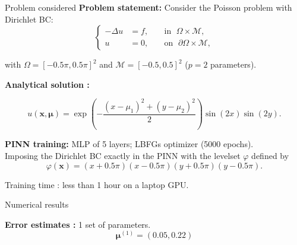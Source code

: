 

\begin{appendixframe}{Problem considered} 
	\textbf{Problem statement:} Consider the Poisson problem with Dirichlet BC:
	\vspace{-5pt}
	\begin{equation*}
		\left\{
		\begin{aligned}
			-\Delta u & = f, \; &  & \text{in } \; \Omega \times \mathcal{M}, \\
			u         & =0, \;  &  & \text{on } \; \partial\Omega \times \mathcal{M},
		\end{aligned}
		\right.
	\end{equation*}

	\vspace{-5pt}
	with $\Omega=[-0.5 \pi, 0.5 \pi]^2$ and $\mathcal{M}=[-0.5,0.5]^2$ ($p=2$ parameters).
		
	\vspace{8pt}
	\textbf{Analytical solution :}

	\vspace{-5pt}
	\begin{equation*}
		u(\bm{x},\bm{\mu})=\exp\left(-\frac{(x-\mu_1)^2+(y-\mu_2)^2}{2}\right)\sin(2 x)\sin(2 y).
	\end{equation*}

	\vspace{12pt}
	\textbf{PINN training:} MLP of 5 layers; LBFGs optimizer (5000 epochs). \\
	Imposing the Dirichlet BC exactly in the PINN with the levelset $\varphi$ defined by
	$$\varphi(\bm{x})=(x+0.5\pi)(x-0.5\pi)(y+0.5\pi)(y-0.5\pi).$$
	
	\small\vspace{4pt}
	Training time : less than 1 hour on a laptop GPU.
\end{appendixframe}

\begin{appendixframe}{Numerical results}
	\hspace{-5pt}\begin{minipage}[t]{0.46\linewidth}
		\textbf{Error estimates :} 1 set of parameters.
		$$\bm{\mu}^{(1)}=(0.05, 0.22) $$
		\vspace{-35pt}
		\begin{figure}[H]
		\end{figure}
	\end{minipage} \qquad \small
	\begin{minipage}[t]{0.48\linewidth}
	\end{minipage}
\end{appendixframe}

